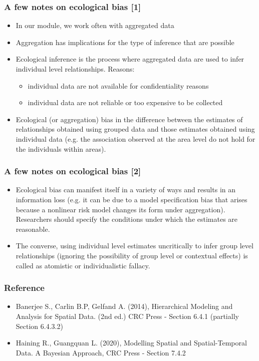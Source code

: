\documentclass[12pt]{beamer}
\begin{document}
\begin{frame}
\frametitle{A few notes on ecological bias [1]}
\begin{itemize} \setlength\itemsep{\fill}
\item In our module, we work often with aggregated data
\item Aggregation has implications for the type of inference that are possible
\item Ecological inference is the process where aggregated data are used to infer individual level relationships. Reasons:
\begin{itemize}
  \item individual data are not available for confidentiality reasons
  \item individual data are not reliable or too expensive to be collected
\end{itemize}
\item \alert{Ecological (or aggregation) bias in the difference between the estimates of relationships obtained using grouped data and those estimates obtained using individual data}
     (e.g. the association observed at the area level do not hold for the individuals within areas).
\end{itemize}
\end{frame}

\begin{frame}
\frametitle{A few notes on ecological bias [2]}
\begin{itemize} \setlength\itemsep{\fill}
\item Ecological bias can manifest itself in a variety of ways and results in an information loss (e.g. it can be due to a model specification bias that arises because a nonlinear risk model changes its form under aggregation). Researchers should specify the conditions under which the estimates are reasonable.
\item The converse, using individual level estimates uncritically to infer group level relationships (ignoring the possibility of group level or contextual effects) is called as \alert{atomistic or individualistic fallacy}.
\end{itemize}
\end{frame}

\begin{frame}
\frametitle{Reference}
\begin{itemize} \setlength\itemsep{\fill}
\item Banerjee S., Carlin B.P, Gelfand A. (2014), Hierarchical Modeling and Analysis for
Spatial Data. (2nd ed.) CRC Press - Section 6.4.1 (partially Section 6.4.3.2)
\item Haining R., Guangquan L. (2020), Modelling Spatial and Spatial-Temporal Data. A Bayesian Approach, CRC Press
- Section 7.4.2
\end{itemize}
\end{frame}
\end{document}
